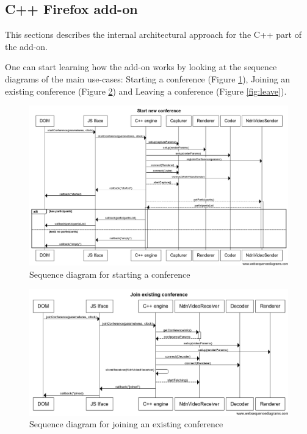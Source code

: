 \documentclass[12pt]{article}
\begin{document}
\subsection{C++ Firefox add-on}
This sections describes the internal architectural approach for the C++ part of the add-on.

One can start learning how the add-on works by looking at the sequence diagrams of the main use-cases: Starting a conference (Figure \ref{fig:start}), Joining an existing conference (Figure \ref{fig:join}) and Leaving a conference (Figure \ref{fig:leave}).

\begin{figure}
\centering
\includegraphics[width=\textwidth]{../res/graphics/start-seq}
\caption{Sequence diagram for starting a conference}
\label{fig:start}
\end{figure}

\begin{figure}
\centering
\includegraphics[width=\textwidth]{../res/graphics/join-seq}
\caption{Sequence diagram for joining an existing conference}
\label{fig:join}
\end{figure}
\end{document}
